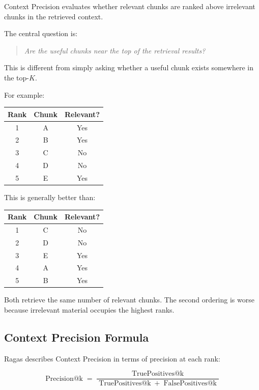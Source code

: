 \documentclass[12pt, a4paper]{article}
\begin{document}
Context Precision evaluates whether relevant chunks are ranked above irrelevant chunks in the retrieved context.

The central question is:

\begin{quote}
\textit{Are the useful chunks near the top of the retrieval results?}
\end{quote}

This is different from simply asking whether a useful chunk exists somewhere in the top-$K$.

For example:

\begin{center}
\begin{tabular}{c|c|c}
\textbf{Rank} & \textbf{Chunk} & \textbf{Relevant?}\\
\midrule
1 & A & Yes\\
2 & B & Yes\\
3 & C & No\\
4 & D & No\\
5 & E & Yes\\
\bottomrule
\end{tabular}
\end{center}

This is generally better than:

\begin{center}
\begin{tabular}{c|c|c}
\textbf{Rank} & \textbf{Chunk} & \textbf{Relevant?}\\
\midrule
1 & C & No\\
2 & D & No\\
3 & E & Yes\\
4 & A & Yes\\
5 & B & Yes\\
\bottomrule
\end{tabular}
\end{center}

Both retrieve the same number of relevant chunks. The second ordering is worse because irrelevant material occupies the highest ranks.

\subsection{Context Precision Formula}

Ragas describes Context Precision in terms of precision at each rank:

\[
\operatorname{Precision@k}
=
\frac{\operatorname{TruePositives@k}}
{\operatorname{TruePositives@k}+\operatorname{FalsePositives@k}}
\]
\end{document}

